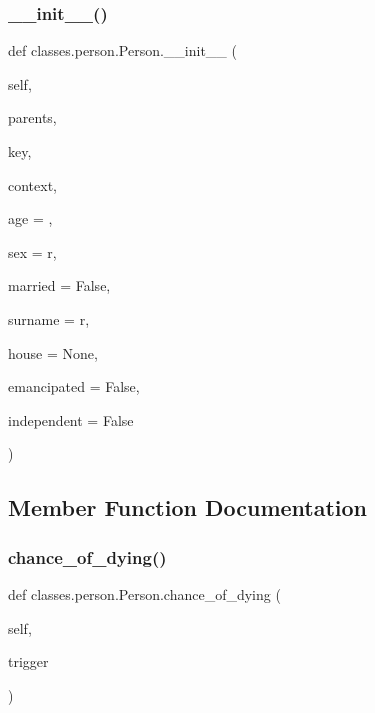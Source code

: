 \subsubsection{\texorpdfstring{\+\_\+\+\_\+init\+\_\+\+\_\+()}{\_\_init\_\_()}}
{\footnotesize\ttfamily def classes.\+person.\+Person.\+\_\+\+\_\+init\+\_\+\+\_\+ (\begin{DoxyParamCaption}\item[{}]{self,  }\item[{}]{parents,  }\item[{}]{key,  }\item[{}]{context,  }\item[{}]{age = {},  }\item[{}]{sex = {\ttfamily \textquotesingle{}r\textquotesingle{}},  }\item[{}]{married = {\ttfamily False},  }\item[{}]{surname = {\ttfamily \textquotesingle{}r\textquotesingle{}},  }\item[{}]{house = {\ttfamily None},  }\item[{}]{emancipated = {\ttfamily False},  }\item[{}]{independent = {\ttfamily False} }\end{DoxyParamCaption})}



\subsection{Member Function Documentation}
\mbox{\label{classclasses_1_1person_1_1Person_aad71d549fbaa9cd3a1e3fa0e14ee093d}} 
\subsubsection{\texorpdfstring{chance\+\_\+of\+\_\+dying()}{chance\_of\_dying()}}
{\footnotesize\ttfamily def classes.\+person.\+Person.\+chance\+\_\+of\+\_\+dying (\begin{DoxyParamCaption}\item[{}]{self,  }\item[{}]{trigger }\end{DoxyParamCaption})}

